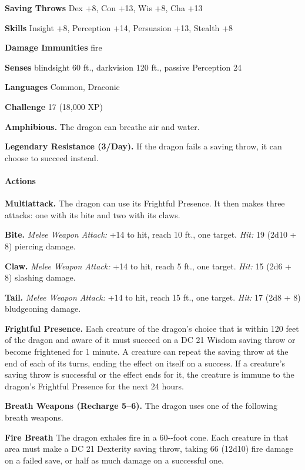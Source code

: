 \documentclass[
]{article}
\begin{document}
\textbf{Saving Throws} Dex +8, Con +13, Wis +8, Cha +13

\textbf{Skills} Insight +8, Perception +14, Persuasion +13, Stealth +8

\textbf{Damage Immunities} fire

\textbf{Senses} blindsight 60 ft., darkvision 120 ft., passive
Perception 24

\textbf{Languages} Common, Draconic

\textbf{Challenge} 17 (18,000 XP)

\textbf{Amphibious.} The dragon can breathe air and water.

\textbf{Legendary Resistance (3/Day).} If the dragon fails a saving
throw, it can choose to succeed instead.

\hypertarget{actions-56}{%
\paragraph{Actions}\label{actions-56}}

\textbf{Multiattack.} The dragon can use its Frightful Presence. It then
makes three attacks: one with its bite and two with its claws.

\textbf{Bite.} \emph{Melee Weapon Attack:} +14 to hit, reach 10 ft., one
target. \emph{Hit:} 19 (2d10 + 8) piercing damage.

\textbf{Claw.} \emph{Melee Weapon Attack:} +14 to hit, reach 5 ft., one
target. \emph{Hit:} 15 (2d6 + 8) slashing damage.

\textbf{Tail.} \emph{Melee Weapon Attack:} +14 to hit, reach 15 ft., one
target. \emph{Hit:} 17 (2d8 + 8) bludgeoning damage.

\textbf{Frightful Presence.} Each creature of the dragon's choice that
is within 120 feet of the dragon and aware of it must succeed on a DC 21
Wisdom saving throw or become frightened for 1 minute. A creature can
repeat the saving throw at the end of each of its turns, ending the
effect on itself on a success. If a creature's saving throw is
successful or the effect ends for it, the creature is immune to the
dragon's Frightful Presence for the next 24 hours.

\textbf{Breath Weapons (Recharge 5--6).} The dragon uses one of the
following breath weapons.

\textbf{Fire Breath} The dragon exhales fire in a 60-­‐foot cone. Each
creature in that area must make a DC 21 Dexterity saving throw, taking
66 (12d10) fire damage on a failed save, or half as much damage on a
successful one.
\end{document}
